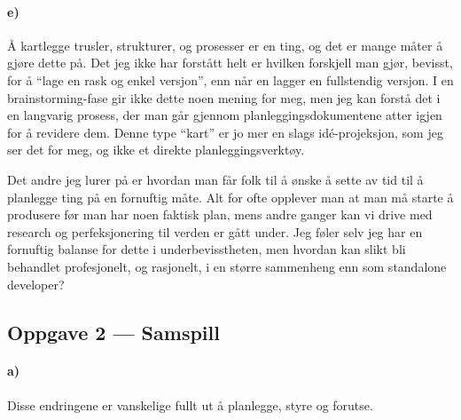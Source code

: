 \documentclass{../../myassignment}
\begin{document}
	\paragraph*{e)}
	\begin{answer}
		Å kartlegge trusler, strukturer, og prosesser er en ting, og det er mange måter å gjøre dette på. Det jeg ikke har forstått helt er hvilken forskjell man gjør, bevisst, for å ``lage en rask og enkel versjon'', enn når en lagger en fullstendig versjon. I en brainstorming-fase gir ikke dette noen mening for meg, men jeg kan forstå det i en langvarig prosess, der man går gjennom planleggingsdokumentene atter igjen for å revidere dem. Denne type ``kart'' er jo mer en slags idé-projeksjon, som jeg ser det for meg, og ikke et direkte planleggingsverktøy.

		Det andre jeg lurer på er hvordan man får folk til å ønske å sette av tid til å planlegge ting på en fornuftig måte. Alt for ofte opplever man at man må starte å produsere før man har noen faktisk plan, mens andre ganger kan vi drive med research og perfeksjonering til verden er gått under. Jeg føler selv jeg har en fornuftig balanse for dette i underbevisstheten, men hvordan kan slikt bli behandlet profesjonelt, og rasjonelt, i en større sammenheng enn som standalone developer?

	\end{answer}

	\pagebreak

	\subsection*{Oppgave 2 --- Samspill}

	\paragraph*{a)}

	\begin{problem}
		Disse endringene er vanskelige fullt ut å planlegge, styre og forutse.
	\end{problem}
\end{document}
